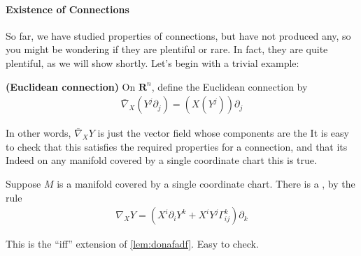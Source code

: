 \documentclass[12pt]{article} %
\newcommand{\bfs}[1]{\textbf{({#1}) }}
\begin{document}
\paragraph{Existence of Connections }
So far, we have studied properties of connections, but have not produced any, so you might be wondering if they are plentiful or rare. In fact, they are quite plentiful, as we will show shortly. Let's begin with a trivial example: 
\begin{defa}\bfs{Euclidean connection}
On $\mathbf{R}^{n}$, define the Euclidean connection by
\begin{align*}
\bar{\nabla}_{X}\left(Y^{j} \partial_{j}\right)=\left(X (Y^{j})\right) \partial_{j}
\end{align*}
\end{defa}
\begin{rema}
 In other words, $\bar{\nabla}_{X} Y$ is just the vector field whose components are the  It is easy to check that this satisfies the required properties for a connection, and that its  Indeed on any manifold covered by a single coordinate chart this is true.
\end{rema}
\begin{lema}
Suppose $M$ is a manifold covered by a single coordinate chart. There is a , by the rule
\begin{align*}
\nabla_{X} Y=\left(X^{i} \partial_{i} Y^{k}+X^{i} Y^{j} \Gamma_{i j}^{k}\right) \partial_{k}
\end{align*}
\end{lema}
\begin{rema}
 This is the ``iff'' extension of \cref{lem:donafadf}.  Easy to check.
\end{rema}
\end{document}
